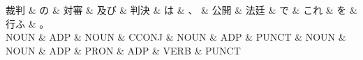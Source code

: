 \documentclass[tikz,border=5pt]{standalone}
\begin{document}
\normalsize
\begin{dependency}[edge unit distance=12.0pt]
    \begin{deptext}[column sep=1em]
        裁判 \& の \& 対審 \& 及び \& 判決 \& は \& 、 \& 公開 \& 法廷 \& で \& これ \& を \& 行ふ \& 。\\
        NOUN \& ADP \& NOUN \& CCONJ \& NOUN \& ADP \& PUNCT \& NOUN \& NOUN \& ADP \& PRON \& ADP \& VERB \& PUNCT\\
    \end{deptext}
\end{dependency}
\end{document}
